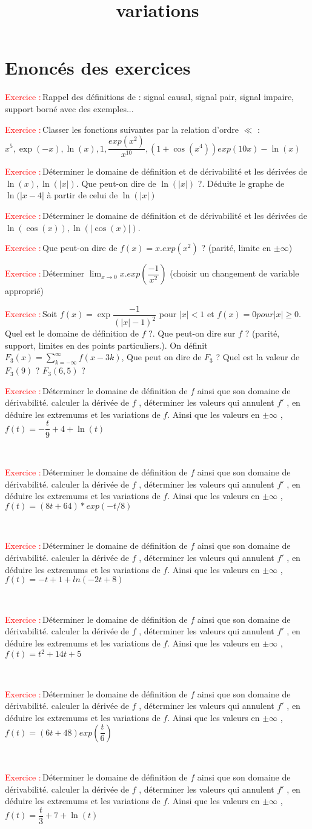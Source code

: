 \documentclass{article}
\newcounter{numexos}
\newcommand{\exercice}[1]{
\addtocounter{numexos}{1}
\textcolor{red}{Exercice\,\thenumexos\,:}\,#1
\\
}
\newcommand{\variation}[1]{
\exercice{Déterminer le domaine de définition de $f$ ainsi que son domaine de dérivabilité. calculer la dérivée de 
$f$ , déterminer les valeurs qui annulent $f'$ , en déduire les extremums et les variations de $f$. Ainsi que les valeurs en  $\pm\infty$ ,#1
}
}
\begin{document}
\title{variations}
\section{Enoncés des exercices}

\exercice{Rappel des définitions de : signal causal, signal pair, signal impaire, support borné avec des exemples...}

\exercice{Classer les fonctions suivantes par la relation d'ordre $\ll$ : $x^5, \exp(-x), \ln(x), 1, \dfrac{exp(x^2)}{x^{10}},(1+\cos(x^4))exp(10x)-\ln(x)$}
\exercice{Déterminer le domaine de définition et de dérivabilité et les dérivées  de $\ln(x), \ln(|x|)$. Que peut-on dire de $\ln(|x|)$ ?. Déduite le graphe de $\ln(|x-4|$ à partir de celui de $\ln(|x|)$}
\exercice{Déterminer le domaine de définition et de dérivabilité et les dérivées  de $\ln(\cos(x)), \ln(|\cos(x)|)$.}

\exercice{Que peut-on dire de $f(x) = x.exp(x^2)$ ? (parité, limite en $\pm\infty$)}
\exercice{Déterminer $\lim_{x\to 0} x.exp(\dfrac{-1}{x^2})$ (choisir un changement de variable approprié)}
\exercice{Soit $f(x) = \exp\dfrac{-1}{(|x|-1)^2}$ pour $|x|<1$ et $f(x)=0 pour |x|\geq 0$. Quel est le domaine de définition de $f$ ?. Que peut-on dire sur $f$ ? (parité, support, limites en des points particuliers.). On définit $F_3(x) = \sum_{k=-\infty}^{\infty} f(x-3k)$, Que peut on dire de $F_3$ ? Quel est la valeur de $F_3(9)$ ? $F_3(6,5)$ ?}
\variation{$f(t) = -\dfrac{t}{9} + 4 + \ln(t)$}
\variation{$f(t) = (8t+64)*exp(-t/8)$}
\variation{$f(t) = -t + 1 + ln(-2t + 8)$}
\variation{$f(t) = t^2+14t+5$}
\variation{$f(t) = (6t+48)exp(\dfrac{t}{6})$}
\variation{$f(t)=\dfrac{t}{3} + 7 + \ln(t)$}
\end{document}
